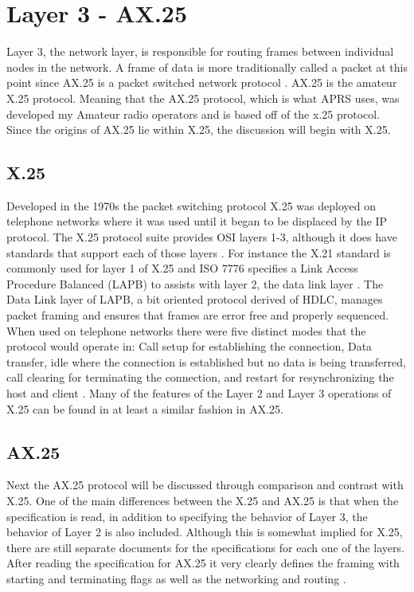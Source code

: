 \section{Layer 3 - AX.25}
Layer 3, the network layer, is responsible for routing frames between individual nodes in the network. A frame of data is more traditionally called a packet at this point since AX.25 is a packet switched network protocol \cite{Peterson2011}. AX.25 is the amateur X.25 protocol. Meaning that the AX.25 protocol, which is what APRS uses, was developed my Amateur radio operators and is based off of the x.25 protocol. Since the origins of AX.25 lie within X.25, the discussion will begin with X.25. 

\subsection{X.25}
Developed in the 1970s the packet switching protocol X.25 was deployed on telephone networks where it was used until it began to be displaced by the IP protocol. The X.25 protocol suite provides OSI layers 1-3, although it does have standards that support each of those layers \cite{Sosinsky2009}. For instance the X.21 standard is commonly used for layer 1 of X.25 and ISO 7776 specifies a Link Access Procedure Balanced (LAPB) to assists with layer 2, the data link layer \cite{Gallagher1997}. The Data Link layer of LAPB, a bit oriented protocol derived of HDLC,  manages packet framing and ensures that frames are error free and properly sequenced. When used on telephone networks there were five distinct modes that the protocol would operate in: Call setup for establishing the connection, Data transfer, idle where the connection is established but no data is being transferred, call clearing for terminating the connection, and restart for resynchronizing the host and client \cite{Javvin2006}. Many of the features of the Layer 2 and Layer 3 operations of X.25 can be found in at least a similar fashion in AX.25.

\subsection{AX.25}
Next the AX.25 protocol will be discussed through comparison and contrast with X.25. One of the main differences between the X.25 and AX.25 is that when the specification is read, in addition to specifying the behavior of Layer 3, the behavior of Layer 2 is also included. Although this is somewhat implied for X.25, there are still separate documents for the specifications for each one of the layers. After reading the specification for AX.25 it very clearly defines the framing with starting and terminating flags as well as the networking and routing \cite{Beech1998}.

